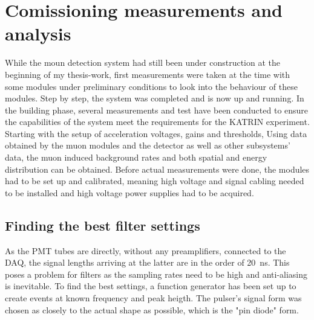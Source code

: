 %

\chapter{Comissioning measurements and analysis}
\label{ch:Analysis}

  While the moun detection system had still been under construction at the beginning of my thesis-work, first measurements were taken at the time with some modules under preliminary conditions to look into the behaviour of these modules. Step by step, the system was completed and is now up and running. In the building phase, several measurements and test have been conducted to ensure the capabilities of the system meet the requirements for the KATRIN experiment. Starting with the setup of acceleration voltages, gains and thresholds, 
  Using data obtained by the muon modules and the detector as well as other subsystems' data, the muon induced background rates and both spatial and energy distribution can be obtained. Before actual measurements were done, the modules had to be set up and calibrated, meaning high voltage and signal cabling needed to be installed and high voltage power supplies had to be acquired.
   
  
  
  
  \section{Finding the best filter settings}
  \label{ch:Analysis:sec:Finding the best filter settings}
 
  
  As the PMT tubes are directly, without any preamplifiers, connected to the DAQ, the signal lengths arriving at the latter are in the order of \SI{20}{\nano\second}. This poses a problem for filters as the sampling rates need to be high and anti-aliasing is inevitable. To find the best settings, a function generator has been set up to create events at known frequency and peak heigth. The pulser's signal form  was chosen as closely to the actual shape as possible, which is the "pin diode" form.
 
